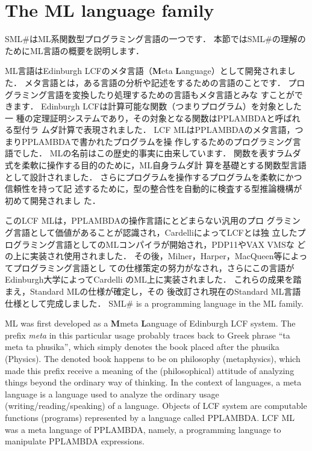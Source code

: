 \documentclass{jbook}
\newcommand{\txt}[2]{#2}
\newcommand{\smlsharp}{SML\#}
\begin{document}
\section{\txt{ML言語について}{The ML language family}}
\label{sec:mllanguage}

\ifx\jp%
	\smlsharp{}はML系関数型プログラミング言語の一つです．
	本節では\smlsharp{}の理解のためにML言語の概要を説明します．

	ML言語はEdinburgh LCF\cite{gord79}のメタ言語（{\bf M}eta {\bf
L}anguage）として開発されました．
	メタ言語とは，ある言語の分析や記述をするための言語のことです．
	プログラミング言語を変換したり処理するための言語もメタ言語とみな
すことができます．
	Edinburgh LCFは計算可能な関数（つまりプログラム）を対象とした一
種の定理証明システムであり，その対象となる関数はPPLAMBDAと呼ばれる型付ラ
ムダ計算で表現されました．
	LCF MLはPPLAMBDAのメタ言語，つまりPPLAMBDAで書かれたプログラムを操
作しするためのプログラミング言語でした．
	MLの名前はこの歴史的事実に由来しています．
	関数を表すラムダ式を柔軟に操作する目的のために，ML自身ラムダ計
算を基礎とする関数型言語として設計されました．
	さらにプログラムを操作するプログラムを柔軟にかつ信頼性を持って記
述するために，型の整合性を自動的に検査する型推論機構が初めて開発されまし
た．

	このLCF MLは，PPLAMBDAの操作言語にとどまらない汎用のプロ
グラミング言語として価値があることが認識され，CardelliによってLCFとは独
立したプログラミング言語としてのMLコンパイラが開始され，PDP11やVAX VMSな
どの上に実装され使用されました．
	その後，Milner，Harper，MacQueen等によってプログラミング言語とし
ての仕様策定の努力がなされ，さらにこの言語がEdinburgh大学によってCardelli
のML上に実装されました．
	これらの成果を踏まえ，Standard MLの仕様\cite{sml}が確定し，その
後改訂され現在のStandard ML言語仕様\cite{sml97}として完成しました．
\else%
	\smlsharp{} is a programming language in the ML family.

	ML was first developed as a {\bf M}meta {\bf L}anguage of
Edinburgh LCF\cite{gord79} system. 
	The prefix {\em meta\/} in this particular usage probably traces
back to Greek phrase ``ta meta ta phusika'', which  simply denotes the
book placed after the phusika (Physics).
	The denoted book happens to be on philosophy (metaphysics), which
made this prefix receive a meaning of the (philosophical) attitude of
analyzing things beyond the ordinary way of thinking.
	In the context of languages, a meta language is a language used
to analyze the ordinary usage (writing/reading/speaking) of a language.
	Objects of LCF system are computable functions (programs)
represented by a language called PPLAMBDA.
	LCF ML was a meta language of PPLAMBDA, namely, a programming
language to manipulate PPLAMBDA expressions.
\end{document}
